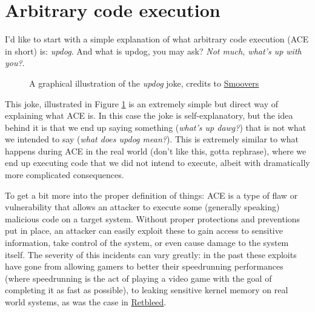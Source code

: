 \documentclass[a4paper]{usiinfbachelorproject}
\begin{document}
\section{\textbf{Arbitrary code execution}}
I'd like to start with a simple explanation of what arbitrary code execution (ACE in short) is: \textit{updog}. And what is updog, you may ask? \textit{Not much, what's up with you?}.

\begin{figure}[h!]
	\caption{A graphical illustration of the \textit{updog} joke, credits to \href{https://www.youtube.com/watch?v=-XmXYCXX7y4}{Smoovers}}\label{fig:updog}
\end{figure}

This joke, illustrated in Figure \ref{fig:updog} is an extremely simple but direct way of explaining what ACE is. In this case the joke is self-explanatory, but the idea behind it is that we end up saying something (\textit{what's up dawg?}) that is not what we intended to say (\textit{what does updog mean?}). This is extremely similar to what happens during ACE in the real world (don't like this, gotta rephrase), where we end up executing code that we did not intend to execute, albeit with dramatically more complicated consequences.

To get a bit more into the proper definition of things: ACE is a type of flaw or vulnerability that allows an attacker to execute some (generally speaking) malicious code on a target system. Without proper protections and preventions put in place, an attacker can easily exploit these to gain access to sensitive information, take control of the system, or even cause damage to the system itself. The severity of this incidents can vary greatly: in the past these exploits have gone from allowing gamers to better their speedrunning performances (where speedrunning is the act of playing a video game with the goal of completing it as fast as possible), to leaking sensitive kernel memory on real world systems, as was the case in \href{https://comsec.ethz.ch/research/microarch/retbleed/}{Retbleed}.
\end{document}
